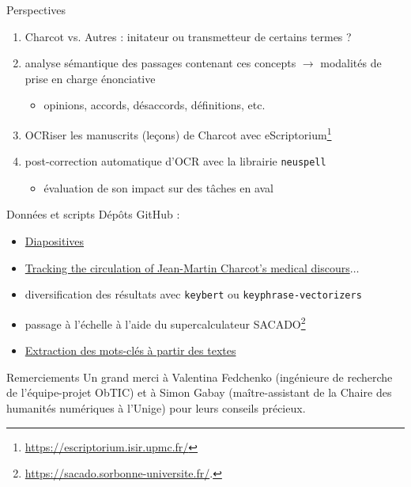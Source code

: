 \begin{frame}{Perspectives}
    \begin{enumerate}
        \item Charcot vs. Autres : initateur ou transmetteur de certains termes ?
        \item analyse sémantique des passages contenant ces concepts $\rightarrow{}$ modalités de prise en charge énonciative
        \begin{itemize}
            \item opinions,
accords, désaccords, définitions, etc.
        \end{itemize}
        \item \textsc{OCR}iser les manuscrits (\og{}leçons\fg{}) de Charcot avec eScriptorium\footnote{\url{https://escriptorium.isir.upmc.fr/}}
        \item post-correction automatique d'\textsc{OCR} avec la librairie \texttt{neuspell}
		\begin{flushright}
		\vspace{-0.2cm}
	{\footnotesize\citep{jayanthi2020neuspell}}	
	\end{flushright}		       
        \begin{itemize}
        \item évaluation de son impact sur des tâches en aval 
        \end{itemize}
        \begin{flushright}
        \vspace{-0.2cm}
        {\footnotesize\citep{grootendorst2022bertopic}}
		\end{flushright}         
    \end{enumerate}
\end{frame}

\begin{frame}{Données et scripts}
Dépôts GitHub :
\begin{itemize}
\item \href{https://github.com/ljpetkovic/Seminaire_doctoral_CERES_270324/settings}{Diapositives}
\item \href{https://github.com/ljpetkovic/Charcot_circulations}{Tracking the circulation of Jean-Martin Charcot’s medical discours$\dots$}
\item diversification des résultats avec \texttt{keybert} ou \texttt{keyphrase-vectorizers}
\item passage à l'échelle à l'aide du supercalculateur \textsc{SACADO}\footnote{\url{https://sacado.sorbonne-universite.fr/}.}
\item \href{https://github.com/ljpetkovic Charcot_KeyBERT_Keyphrase-Vectorizers}{Extraction des mots-clés à partir des textes}
\end{itemize}
\end{frame}

\begin{frame}{Remerciements}
\justifying
Un grand merci à Valentina Fedchenko (ingénieure de recherche de l'équipe-projet ObTIC) et à Simon Gabay (maître-assistant de la Chaire des humanités numériques à l'Unige) pour leurs conseils précieux.
\end{frame}